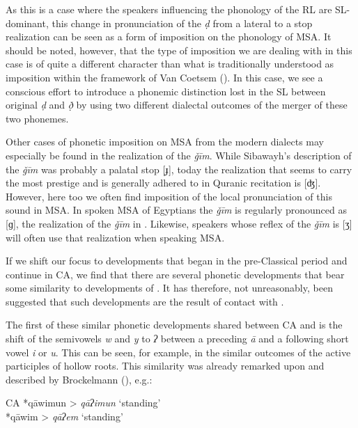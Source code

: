 \documentclass[output=paper]{langsci/langscibook}
\begin{document}
As this is a case where the speakers influencing the phonology of the {RL} are SL-dominant, this change in pronunciation of the \textit{ḍ} from a lateral to a stop realization can be seen as a form of {imposition} on the phonology of MSA. It should be noted, however, that the type of {imposition} we are dealing with in this case is of quite a different character than what is traditionally understood as {imposition} within the framework of Van Coetsem (\citeyear{VanCoetsem1988,VanCoetsem2000}). In this case, we see a conscious effort to introduce a phonemic distinction lost in the {SL} between original \textit{ḍ} and \textit{ð̣} by using two different dialectal outcomes of the {merger} of these two phonemes.

Other cases of phonetic {imposition} on MSA from the modern dialects may especially be found in the realization of the \textit{ǧīm}. While Sibawayh’s description of the \textit{ǧīm} was probably a palatal stop [ɟ], today the realization that seems to carry the most {prestige} and is generally adhered to in Quranic recitation is [ʤ]. However, here too we often find {imposition} of the local pronunciation of this sound in MSA. In spoken MSA of Egyptians the \textit{ǧīm} is regularly pronounced as [ɡ], the realization of the \textit{ǧīm} in . Likewise,   speakers whose reflex of the \textit{ǧīm} is [ʒ] will often use that realization when speaking MSA.

If we shift our focus to developments that began in the pre-Classical period and continue in CA, we find that there are several phonetic developments that bear some similarity to developments of . It has therefore, not unreasonably, been suggested that such developments are the result of contact with .

The first of these similar phonetic developments shared between CA and  is the shift of the semivowels  \textit{w} and \textit{y} to \textit{ʔ} between a preceding \textit{ā} and a following short vowel \textit{i} or \textit{u}. This can be seen, for example, in the similar outcomes of the active participles of hollow {roots}. This similarity was already remarked upon and described by Brockelmann (\citeyear[138--139]{Brockelmann1908}), e.g.:

\ea
\ea CA *qāwimun > \textit{qāʔimun} ‘standing’\\
\ex {} *qāwim > \textit{qāʔem} ‘standing’
\z
\z
\end{document}
